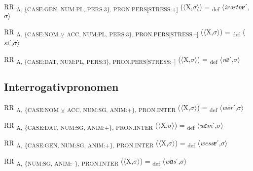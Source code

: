 {\begin{exe}
 RR \textsubscript{A, \{CASE:GEN, NUM:PL, PERS:3\}, PRON.PERS[STRESS:+]} ($\langle$X,$\sigma $$\rangle$) = \textsubscript{def} $\langle$\textit{irərtnɐ}ˊ,$\sigma $$\rangle$
\end{exe}

\begin{exe}
 RR \textsubscript{A, \{CASE:NOM} \textsubscript{${\veebar}$}\textsubscript{ ACC, NUM:PL, PERS:3\}, PRON.PERS[STRESS:–]} ($\langle$X,$\sigma $$\rangle$) = \textsubscript{def} $\langle$\textit{si}ˊ,$\sigma $$\rangle$
\end{exe}

\begin{exe}
 RR \textsubscript{A, \{CASE:DAT, NUM:PL, PERS:3\}, PRON.PERS[STRESS:–]} ($\langle$X,$\sigma $$\rangle$) = \textsubscript{def} $\langle$\textit{nɐ}ˊ,$\sigma $$\rangle$
\end{exe}

\subsection{Interrogativpronomen}

\begin{exe}
 RR \textsubscript{A,} \textsubscript{\{CASE:NOM} \textsubscript{${\veebar}$}\textsubscript{ ACC, NUM:SG, ANIM:+\},} \textsubscript{PRON.INTER} ($\langle$X,$\sigma $$\rangle$) = \textsubscript{def} $\langle$\textit{w\=er}ˊ,$\sigma $$\rangle$
\end{exe}

\begin{exe}
 RR \textsubscript{A,} \textsubscript{\{CASE:DAT, NUM:SG, ANIM:+\},} \textsubscript{PRON.INTER} ($\langle$X,$\sigma $$\rangle$) = \textsubscript{def} $\langle$\textit{wɛm}ˊ,$\sigma $$\rangle$
\end{exe}

\begin{exe}
 RR \textsubscript{A,} \textsubscript{\{CASE:GEN, NUM:SG, ANIM:+\},} \textsubscript{PRON.INTER} ($\langle$X,$\sigma $$\rangle$) = \textsubscript{def} $\langle$\textit{wessɐ}ˊ,$\sigma $$\rangle$
\end{exe}

\begin{exe}
 RR \textsubscript{A,} \textsubscript{\{NUM:SG, ANIM:–\},} \textsubscript{PRON.INTER} ($\langle$X,$\sigma $$\rangle$) = \textsubscript{def} $\langle$\textit{wɑs}ˊ,$\sigma $$\rangle$
\end{exe}

}
